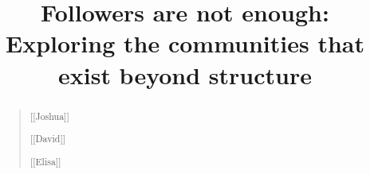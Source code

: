 \documentclass[letterpaper]{article}
\begin{document}
\title{
Followers are not enough: Exploring the communities that exist beyond structure \\
 }

\maketitle

\begin{abstract}
\begin{quote}
[[Joshua]]

[[David]]

[[Elisa]]

\end{quote}
\end{abstract}










\end{document}
